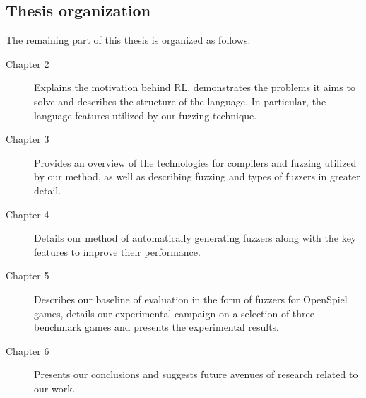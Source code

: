 \subsection*{Thesis organization}
The remaining part of this thesis is organized as follows:
\begin{description}
    \item [Chapter 2] Explains the motivation behind RL, demonstrates the problems it aims to solve and describes the structure of the language. In particular, the language features utilized by our fuzzing technique.
    \item [Chapter 3] Provides an overview of the technologies for compilers and fuzzing utilized by our method, as well as describing fuzzing and types of fuzzers in greater detail.
    \item [Chapter 4] Details our method of automatically generating fuzzers along with the key features to improve their performance.
    \item [Chapter 5] Describes our baseline of evaluation in the form of fuzzers for OpenSpiel games, details our experimental campaign on a selection of three benchmark games and presents the experimental results.
    \item [Chapter 6] Presents our conclusions and suggests future avenues of research related to our work. 
\end{description}
